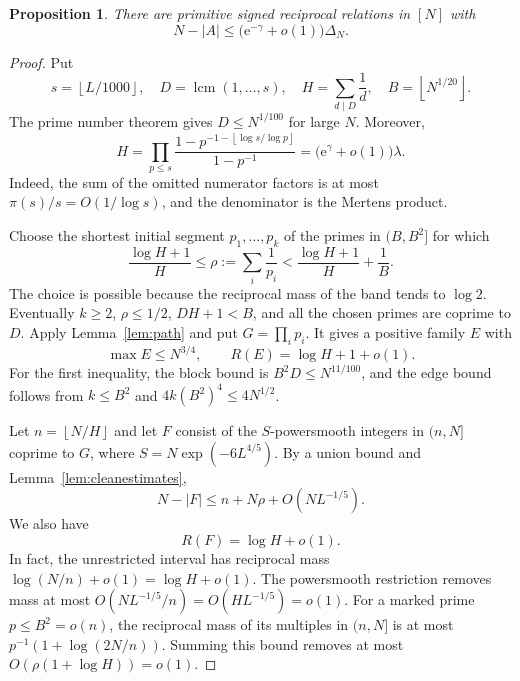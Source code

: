 \documentclass[11pt,leqno]{amsart}
\numberwithin{equation}{section}
\newtheorem{proposition}[theorem]{Proposition}
\theoremstyle{definition}
\theoremstyle{remark}
\newcommand{\e}{\mathrm e}
\newcommand{\lcm}{\operatorname{lcm}}
\newcommand{\card}[1]{\lvert #1\rvert}
\newcommand{\floor}[1]{\left\lfloor #1\right\rfloor}
\begin{document}
\begin{proposition}\label{prop:upper}
There are primitive signed reciprocal relations in $[N]$ with
\[
 N-\card A\le\bigl(\e^{-\gamma}+o(1)\bigr)\Delta_N.
\]
\end{proposition}

\begin{proof}
Put
\[
 s=\floor{L/1000},\quad D=\lcm(1,\ldots,s),\quad
 H=\sum_{d\mid D}\frac1d,\quad B=\floor{N^{1/20}}.
\]
The prime number theorem gives $D\le N^{1/100}$ for large $N$.
Moreover,
\begin{equation}\label{eq:divisormass}
 H=\prod_{p\le s}\frac{1-p^{-1-\floor{\log s/\log p}}}{1-p^{-1}}
 =\bigl(\e^\gamma+o(1)\bigr)\lambda.
\end{equation}
Indeed, the sum of the omitted numerator factors is at most
$\pi(s)/s=O(1/\log s)$, and the denominator is the Mertens product.

Choose the shortest initial segment $p_1,\ldots,p_k$ of the primes in
$(B,B^2]$ for which
\begin{equation}\label{eq:rhochoice}
 \frac{\log H+1}{H}\le\rho:=\sum_i\frac1{p_i}
 <\frac{\log H+1}{H}+\frac1B.
\end{equation}
The choice is possible because the reciprocal mass of the band tends
to $\log2$. Eventually $k\ge2$, $\rho\le1/2$, $DH+1<B$, and all the
chosen primes are coprime to $D$. Apply Lemma~\ref{lem:path} and put
$G=\prod_i p_i$. It gives a positive family $E$ with
\begin{equation}\label{eq:Eupper}
 \max E\le N^{3/4},\qquad R(E)=\log H+1+o(1).
\end{equation}
For the first inequality, the block bound is
$B^2D\le N^{11/100}$, and the edge bound follows from $k\le B^2$ and
$4k(B^2)^4\le4N^{1/2}$.

Let $n=\floor{N/H}$ and let $F$ consist of the $S$-powersmooth integers
in $(n,N]$ coprime to $G$, where $S=N\exp(-6L^{4/5})$.
By a union bound and Lemma~\ref{lem:cleanestimates},
\begin{equation}\label{eq:Fcount}
 N-\card F\le n+N\rho+O(NL^{-1/5}).
\end{equation}
We also have
\begin{equation}\label{eq:Fmass}
 R(F)=\log H+o(1).
\end{equation}
In fact, the unrestricted interval has reciprocal mass
$\log(N/n)+o(1)=\log H+o(1)$.
The powersmooth restriction removes mass at most
$O(NL^{-1/5}/n)=O(HL^{-1/5})=o(1)$.
For a marked prime $p\le B^2=o(n)$, the reciprocal mass of its multiples
in $(n,N]$ is at most
$p^{-1}(1+\log(2N/n))$. Summing this bound removes at most
$O(\rho(1+\log H))=o(1)$.


\end{proof}
\end{document}
